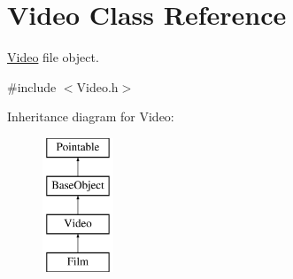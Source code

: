 \hypertarget{classVideo}{\section{Video Class Reference}
\label{classVideo}
}


\hyperlink{classVideo}{Video} file object.  




{\ttfamily \#include $<$Video.\-h$>$}

Inheritance diagram for Video\-:\begin{figure}[H]
\begin{center}
\leavevmode
\includegraphics[height=4.000000cm]{classVideo}
\end{center}
\end{figure}
